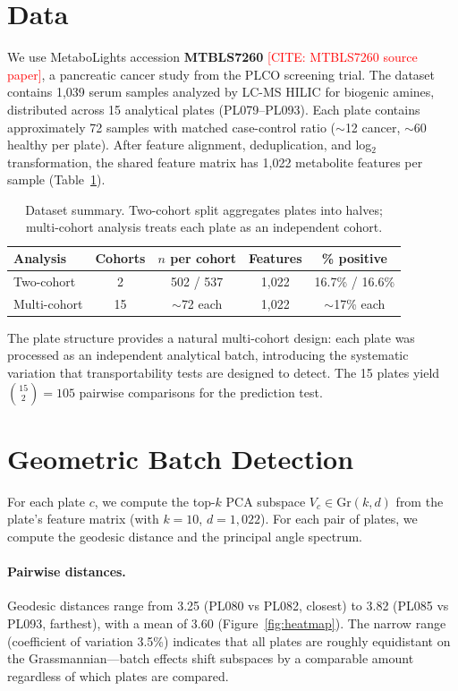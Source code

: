 \documentclass{article}
\begin{document}
\section{Data}

We use MetaboLights accession \textbf{MTBLS7260} \textcolor{red}{[CITE: MTBLS7260 source paper]}, a pancreatic cancer study from the PLCO screening trial. The dataset contains 1{,}039 serum samples analyzed by LC-MS HILIC for biogenic amines, distributed across 15 analytical plates (PL079--PL093). Each plate contains approximately 72 samples with matched case-control ratio ($\sim$12 cancer, $\sim$60 healthy per plate). After feature alignment, deduplication, and log$_2$ transformation, the shared feature matrix has 1{,}022 metabolite features per sample (Table~\ref{tab:cohorts}).

\begin{table}[t]
\centering
\caption{Dataset summary. Two-cohort split aggregates plates into halves; multi-cohort analysis treats each plate as an independent cohort.}
\label{tab:cohorts}
\begin{tabular}{lcccc}
\toprule
Analysis & Cohorts & $n$ per cohort & Features & \% positive \\
\midrule
Two-cohort & 2 & 502 / 537 & 1{,}022 & 16.7\% / 16.6\% \\
Multi-cohort & 15 & $\sim$72 each & 1{,}022 & $\sim$17\% each \\
\bottomrule
\end{tabular}
\end{table}

The plate structure provides a natural multi-cohort design: each plate was processed as an independent analytical batch, introducing the systematic variation that transportability tests are designed to detect. The 15 plates yield $\binom{15}{2} = 105$ pairwise comparisons for the prediction test.


\section{Geometric Batch Detection}
\label{sec:batch}

For each plate $c$, we compute the top-$k$ PCA subspace $V_c \in \mathrm{Gr}(k, d)$ from the plate's feature matrix (with $k = 10$, $d = 1{,}022$). For each pair of plates, we compute the geodesic distance and the principal angle spectrum.

\paragraph{Pairwise distances.} Geodesic distances range from 3.25 (PL080 vs PL082, closest) to 3.82 (PL085 vs PL093, farthest), with a mean of 3.60 (Figure~\ref{fig:heatmap}). The narrow range (coefficient of variation 3.5\%) indicates that all plates are roughly equidistant on the Grassmannian---batch effects shift subspaces by a comparable amount regardless of which plates are compared.
\end{document}
